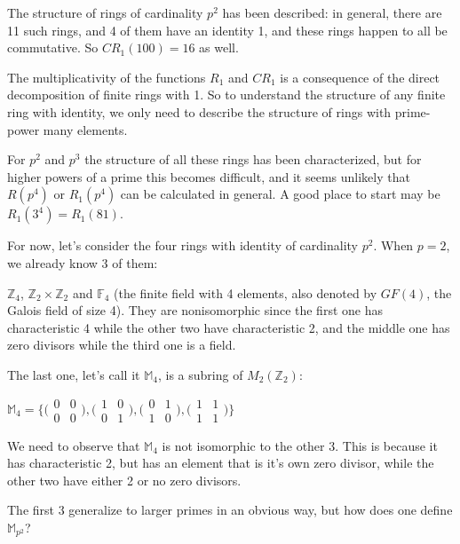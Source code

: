 \documentclass{amsart}
\begin{document}
The structure of rings of cardinality $p^2$ has been described: in general, there are 11 such rings, and 4 of them have an identity 1, and these rings happen to all be commutative. So $CR_1(100)=16$ as well.

The multiplicativity of the functions $R_1$ and $CR_1$ is a consequence of the direct decomposition of finite rings with 1. So to understand  the structure of any finite ring with identity, we only need to describe the structure of rings with prime-power many elements.

For $p^2$ and $p^3$ the structure of all these rings has been characterized, but for higher powers of a prime this becomes difficult, and it seems unlikely that $R(p^4)$ or $R_1(p^4)$ can be calculated in general. A good place to start may be $R_1(3^4)=R_1(81)$.

For now, let's consider the four rings with identity of cardinality $p^2$. When $p=2$, we already know 3 of them:

$\mathbb Z_4$, $\mathbb Z_2\times \mathbb Z_2$ and $\mathbb F_4$ (the finite field with 4 elements, also denoted by $GF(4)$, the Galois field of size 4). They are nonisomorphic since the first one has characteristic 4 while the other two have characteristic 2, and the middle one has zero divisors while the third one is a field.

The last one, let's call it $\mathbb M_4$, is a subring of $M_2(\mathbb Z_2)$: 

$\mathbb M_4=\big\{
\big(\begin{smallmatrix} 0&0\\0&0\end{smallmatrix}\big),
\big(\begin{smallmatrix} 1&0\\0&1\end{smallmatrix}\big),
\big(\begin{smallmatrix} 0&1\\1&0\end{smallmatrix}\big),
\big(\begin{smallmatrix} 1&1\\1&1\end{smallmatrix}\big)\big\}$ 

We need to observe that $\mathbb M_4$ is not isomorphic to the other 3. This is because it has characteristic 2, but has an element that is it's own zero divisor, while the other two have either 2 or no zero divisors.

The first 3 generalize to larger primes in an obvious way, but how does one define $\mathbb M_{p^2}$?
\end{document}

